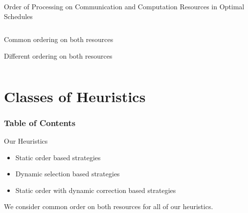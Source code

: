 \documentclass[mathserif,hyperref={pdfpagemode=FullScreen}]{beamer}
\newcommand{\schedule}[3]{
	\draw[->] (-0.2, 0) -- (#1, 0) node[below] {$t$};
	\draw (0, 0) -- (0, 1.5);
	\node at (-0.8, 0.75)[rotate=90] {#2};
	\draw[dashed,gray] (0, 0.75) -- (#1, 0.75);
	\foreach \t in {0,#3} {
		\node[xtick=\t] at (\t, 0){};
	}
}
\begin{document}
\begin{frame}[fragile]{Order of Processing on Communication and Computation Resources in Optimal Schedules}
\begin{columns}
	\begin{column}[c]{.65\linewidth}
\footnotesize
	\begin{block}{Common ordering on both resources}
	\end{block}
\begin{block}{Different ordering on both
		resources}
\end{block}
	\end{column}
\end{columns}
\end{frame}

\section{Classes of Heuristics}
\begin{frame}
\frametitle{Table of Contents}
\tableofcontents[currentsection]
\end{frame}

\begin{frame}{Our Heuristics}
\begin{itemize}
	\vfill
	\item Static order based strategies
	\vfill
	\item Dynamic selection based strategies
	\vfill
	\item Static order with dynamic correction based strategies
	\vfill
\end{itemize}
We consider common order on both resources for all of our heuristics.
\end{frame}
\end{document}
